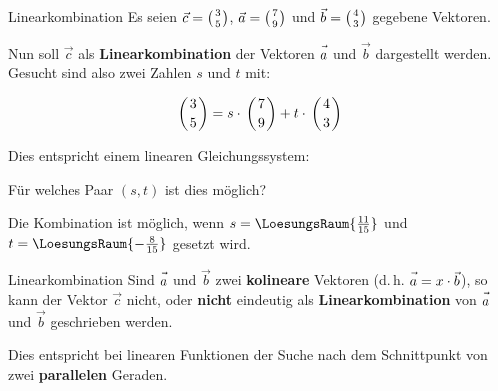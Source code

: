 \begin{beispiel}{Linearkombination}{}
  Es seien $\vec{c} = \left(3 \atop 5\right)$, $\vec{a} = \left(7 \atop
  9\right)$ und $\vec{b} = \left(4 \atop 3\right)$ gegebene Vektoren.

  Nun soll $\vec{c}$ als \textbf{Linearkombination} der Vektoren
  $\vec{a\vphantom{b}}$ und $\vec{b}$ dargestellt werden. Gesucht sind also zwei
  Zahlen $s$ und $t$ mit:

  $$\left(3 \atop 5\right) = s\cdot{} \left(7 \atop 9\right) +
  t\cdot{} \left(4 \atop 3\right)$$

  Dies entspricht einem linearen Gleichungssystem:

  Für welches Paar $(s, t)$ ist dies möglich?
  
  
  Die Kombination ist möglich, wenn $s=\LoesungsRaum{\frac{11}{15}}$ und\\
  $t=\LoesungsRaum{-\frac{8}{15}}$ gesetzt wird.
\end{beispiel}

\begin{bemerkung}{Linearkombination}{}
  Sind $\vec{a\vphantom{b}}$ und $\vec{b}$ zwei \textbf{kolineare} Vektoren
  (d.\,h. $\vec{a\vphantom{b}} = x\cdot{}\vec{b}$), so kann der Vektor $\vec{c}$
  nicht, oder \textbf{nicht} eindeutig als \textbf{Linearkombination} von $\vec{a\vphantom{b}}$ und
  $\vec{b}$ geschrieben werden.

  Dies entspricht bei linearen Funktionen der Suche nach dem
  Schnittpunkt von zwei \textbf{parallelen} Geraden.
  \end{bemerkung}

\newpage

